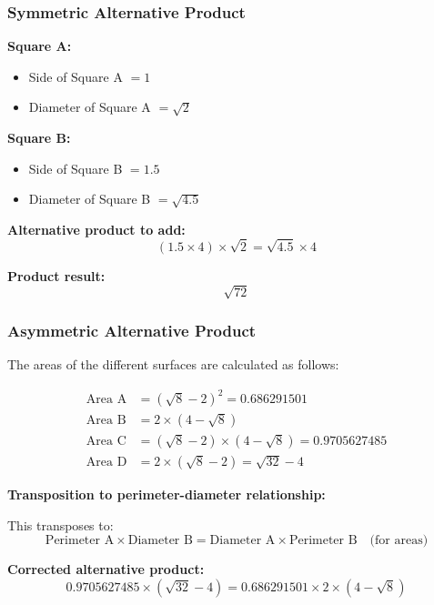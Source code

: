 \documentclass[a4paper,11pt]{article}
\newenvironment{exemple}[1][]{%
    \begin{tcolorbox}[colback=green!5,colframe=holgreen,title={\textbf{Example #1}}]
}{%
    \end{tcolorbox}
}
\begin{document}
\subsubsection{Symmetric Alternative Product}

\begin{exemple}[: Symmetric Alternative Product Calculation]

\textbf{Square A:}
\begin{itemize}
    \item Side of Square A $= 1$
    \item Diameter of Square A $= \sqrt{2}$
\end{itemize}

\textbf{Square B:}
\begin{itemize}
    \item Side of Square B $= 1.5$
    \item Diameter of Square B $= \sqrt{4.5}$
\end{itemize}

\textbf{Alternative product to add:}
\[
(1.5 \times 4) \times \sqrt{2} = \sqrt{4.5} \times 4
\]

\textbf{Product result:}
\[
\sqrt{72}
\]
\end{exemple}

\subsubsection{Asymmetric Alternative Product}

\begin{exemple}[: Area Calculation -- Corrected]
The areas of the different surfaces are calculated as follows:

\begin{align}
\text{Area A} &= (\sqrt{8} - 2)^2 = 0.686291501 \\
\text{Area B} &= 2 \times (4 - \sqrt{8}) \\
\text{Area C} &= (\sqrt{8} - 2) \times (4 - \sqrt{8}) = 0.9705627485 \\
\text{Area D} &= 2 \times (\sqrt{8} - 2) = \sqrt{32} - 4
\end{align}
\end{exemple}

\textbf{Transposition to perimeter-diameter relationship:}

This transposes to:
\[
\text{Perimeter A} \times \text{Diameter B} = \text{Diameter A} \times \text{Perimeter B} \quad \text{(for areas)}
\]

\textbf{Corrected alternative product:}
\[
0.9705627485 \times (\sqrt{32} - 4) = 0.686291501 \times 2 \times (4 - \sqrt{8})
\]
\end{document}

